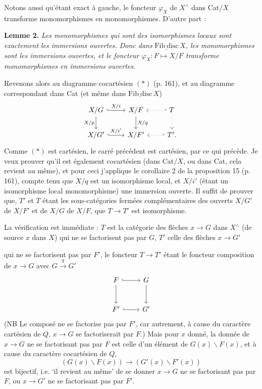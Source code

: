 \documentclass[11pt]{article}
\newcommand{\printedpage}[1]{\marginpar{\footnotesize p.~#1}}
\newcommand{\msp}[1]{\marginpar{\footnotesize [#1]}}
\newcommand{\Fibdisc}{\underline{\mathrm{Fib\ disc}}}
\begin{document}
\msp{page 165}
Notons aussi qu'étant exact à gauche, le foncteur $\varphi_X$ de $X^{\wedge}$ dans Cat$/X$ transforme monomorphismes en monomorphismes. D'autre part :

\textbf{Lemme 2.} \textit{Les monomorphismes qui sont des isomorphismes locaux sont exactement les immersions ouvertes. Donc dans} $\Fibdisc\, X$\textit{, les monomorphismes sont les immersions ouvertes, et le foncteur $\varphi_X : F \longmapsto X/F$ transforme monomorphismes en immersions ouvertes.}

Revenons alors au diagramme cocartésien $(*)$ (p. 161), et au diagramme correspondant dans Cat (et même dans $\Fibdisc\, X$)
\[
\begin{tikzcd}
X/G \ar[r, hook, "X/i"] \ar[d, "X/p"'] & X/F \ar[d, "X/q"] & T \ar[l, hook', dotted] \ar[d, dotted] \\
X/G' \ar[r, hook, "X/i'"] & X/F' & T'. \ar[l, hook', dotted]
\end{tikzcd}
\]
Comme $(*)$ est cartésien, le carré précédent est cartésien, par ce qui précède. Je veux prouver qu'il est également cocartésien
\msp{page 166}
(dans Cat$/X$, ou dans Cat, cela revient au même), et pour ceci j'applique le corollaire 2 de la proposition 15 (p. 161), compte tenu que $X/q$ est un isomorphisme local, et $X/i'$ (étant un isomorphisme local monomorphisme) une immersion ouverte. Il suffit de prouver que, $T'$ et $T$ étant les sous-catégories fermées complémentaires des ouverts $X/G'$ de $X/F'$ et de $X/G$ de $X/F$, que $T \longrightarrow T'$ est isomorphisme.

{\small} %

La vérification est immédiate : $T$ est la catégorie des flèches $x \longrightarrow G$ dans $X^{\wedge}$ (de source $x$ dans $X$) qui ne se factorisent pas par $G$, $T'$ celle des flèches $x \longrightarrow G'$

\printedpage{113}
qui ne se factorisent pas par $F'$, le foncteur $T \longrightarrow T'$ étant le foncteur composition de $x \longrightarrow G$ avec $G \xrightarrow{q} G'$
\[
\begin{tikzcd}[row sep=large]
F \arrow[r, hook] \arrow[d] & G \arrow[d] \\
F' \arrow[r, hook] & G'
\end{tikzcd}
\]
(NB Le composé ne se factorise pas par $F'$, car autrement, à cause du caractère cartésien de $Q$, $x \longrightarrow G$ se factoriserait par $F$.) Mais pour $x$ donné, la donnée de $x \longrightarrow G$ ne se factorisant pas par $F$ est celle d’un élément \msp{page 167} de $G(x)\backslash F(x)$, et à cause du caractère cocartésien de $Q$,
\[
(G(x)\backslash F(x)) \longrightarrow (G'(x)\backslash F'(x))
\]
est bijectif, i.e. ‘il revient au même’ de se donner $x \longrightarrow G$ ne se factorisant pas par $F$, ou $x \longrightarrow G'$ ne se factorisant pas par $F'$.
\end{document}
